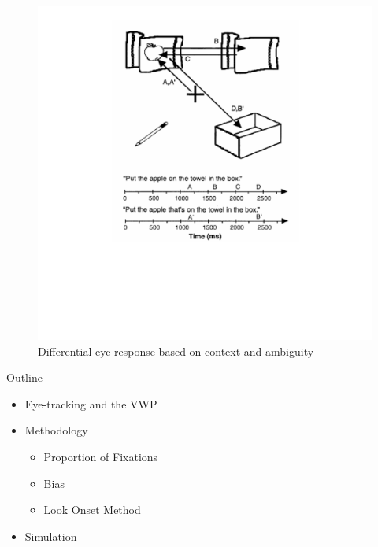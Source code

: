 \documentclass{beamer}
\newcommand{\vp}{\vspace{2mm}}
\begin{document}
\begin{frame}%
\begin{figure}
\centering
\includegraphics[width=\textwidth]{apple_combine_half.pdf}
\caption{Differential eye response based on context and ambiguity}
\end{figure}
\end{frame}


\begin{frame}{Outline}\large


\begin{itemize}
	\item Eye-tracking and the VWP \vp
	\item Methodology 
	\begin{itemize}
	\item Proportion of Fixations
	\item Bias
	\item Look Onset Method \vp
	\end{itemize}
	\item Simulation
\end{itemize}

\end{frame}
\end{document}

